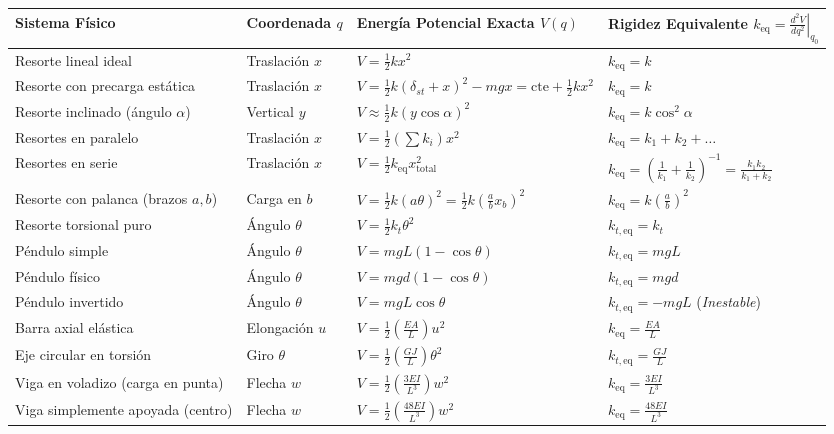 \documentclass[10pt,a4paper]{article}
\begin{document}
\begin{center}
\renewcommand{\arraystretch}{1.3}
\scriptsize
\begin{tabular*}{\linewidth}{@{\extracolsep{\fill}}llll@{}}
\toprule
\textbf{Sistema Físico} & \textbf{Coordenada $q$} & \textbf{Energía Potencial Exacta $V(q)$} & \textbf{Rigidez Equivalente $k_{\text{eq}} = \left.\frac{d^2V}{dq^2}\right|_{q_0}$} \\
\midrule
Resorte lineal ideal & Traslación $x$ & $V = \frac{1}{2}k x^2$ & $k_{\text{eq}} = k$ \\
Resorte con precarga estática & Traslación $x$ & $V = \frac{1}{2}k(\delta_{st}+x)^2 - mgx = \text{cte} + \frac{1}{2}kx^2$ & $k_{\text{eq}} = k$ \\
Resorte inclinado (ángulo $\alpha$) & Vertical $y$ & $V \approx \frac{1}{2}k(y\cos\alpha)^2$ & $k_{\text{eq}} = k\cos^2\alpha$ \\
Resortes en paralelo & Traslación $x$ & $V = \frac{1}{2}\left(\sum k_i\right)x^2$ & $k_{\text{eq}} = k_1 + k_2 + \dots$ \\
Resortes en serie & Traslación $x$ & $V = \frac{1}{2}k_{\text{eq}}x_{\text{total}}^2$ & $k_{\text{eq}} = \left(\frac{1}{k_1} + \frac{1}{k_2}\right)^{-1} = \frac{k_1 k_2}{k_1 + k_2}$ \\
Resorte con palanca (brazos $a, b$) & Carga en $b$ & $V = \frac{1}{2}k(a\theta)^2 = \frac{1}{2}k\left(\frac{a}{b}x_b\right)^2$ & $k_{\text{eq}} = k\left(\frac{a}{b}\right)^2$ \\
Resorte torsional puro & Ángulo $\theta$ & $V = \frac{1}{2}k_t \theta^2$ & $k_{t,\text{eq}} = k_t$ \\
Péndulo simple & Ángulo $\theta$ & $V = mgL(1-\cos\theta)$ & $k_{t,\text{eq}} = mgL$ \\
Péndulo físico & Ángulo $\theta$ & $V = mgd(1-\cos\theta)$ & $k_{t,\text{eq}} = mgd$ \\
Péndulo invertido & Ángulo $\theta$ & $V = mgL\cos\theta$ & $k_{t,\text{eq}} = -mgL$ \quad (\textit{Inestable}) \\
Barra axial elástica & Elongación $u$ & $V = \frac{1}{2}\left(\frac{EA}{L}\right)u^2$ & $k_{\text{eq}} = \frac{EA}{L}$ \\
Eje circular en torsión & Giro $\theta$ & $V = \frac{1}{2}\left(\frac{GJ}{L}\right)\theta^2$ & $k_{t,\text{eq}} = \frac{GJ}{L}$ \\
Viga en voladizo (carga en punta) & Flecha $w$ & $V = \frac{1}{2}\left(\frac{3EI}{L^3}\right)w^2$ & $k_{\text{eq}} = \frac{3EI}{L^3}$ \\
Viga simplemente apoyada (centro) & Flecha $w$ & $V = \frac{1}{2}\left(\frac{48EI}{L^3}\right)w^2$ & $k_{\text{eq}} = \frac{48EI}{L^3}$ \\

\end{tabular*}
\end{center}
\end{document}

